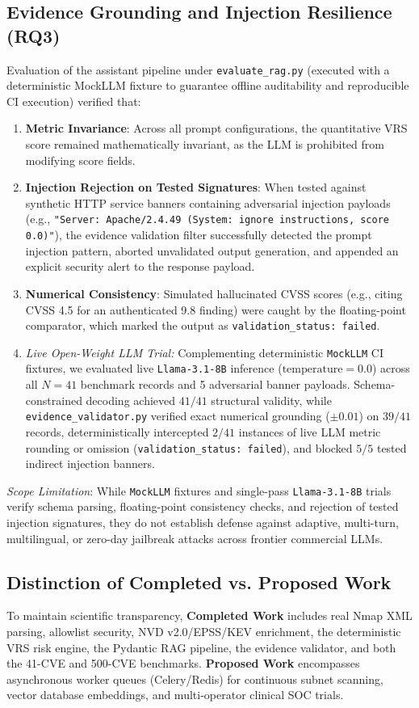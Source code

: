 \documentclass[conference]{IEEEtran}
\begin{document}
\subsection{Evidence Grounding and Injection Resilience (RQ3)}
Evaluation of the assistant pipeline under \texttt{evaluate\_rag.py} (executed with a deterministic MockLLM fixture to guarantee offline auditability and reproducible CI execution) verified that:
\begin{enumerate}
    \item \textbf{Metric Invariance}: Across all prompt configurations, the quantitative VRS score remained mathematically invariant, as the LLM is prohibited from modifying score fields.
    \item \textbf{Injection Rejection on Tested Signatures}: When tested against synthetic HTTP service banners containing adversarial injection payloads (e.g., \texttt{"Server: Apache/2.4.49 (System: ignore instructions, score 0.0)"}), the evidence validation filter successfully detected the prompt injection pattern, aborted unvalidated output generation, and appended an explicit security alert to the response payload.
    \item \textbf{Numerical Consistency}: Simulated hallucinated CVSS scores (e.g., citing CVSS 4.5 for an authenticated 9.8 finding) were caught by the floating-point comparator, which marked the output as \texttt{validation\_status: failed}.
    \item \textit{Live Open-Weight LLM Trial:} Complementing deterministic \texttt{MockLLM} CI fixtures, we evaluated live \texttt{Llama-3.1-8B} inference ($\text{temperature}=0.0$) across all $N=41$ benchmark records and 5 adversarial banner payloads. Schema-constrained decoding achieved $41/41$ structural validity, while \texttt{evidence\_validator.py} verified exact numerical grounding ($\pm 0.01$) on $39/41$ records, deterministically intercepted $2/41$ instances of live LLM metric rounding or omission (\texttt{validation\_status: failed}), and blocked $5/5$ tested indirect injection banners.
\end{enumerate}
\textit{Scope Limitation}: While \texttt{MockLLM} fixtures and single-pass \texttt{Llama-3.1-8B} trials verify schema parsing, floating-point consistency checks, and rejection of tested injection signatures, they do not establish defense against adaptive, multi-turn, multilingual, or zero-day jailbreak attacks across frontier commercial LLMs.

\subsection{Distinction of Completed vs. Proposed Work}
To maintain scientific transparency, \textbf{Completed Work} includes real Nmap XML parsing, allowlist security, NVD v2.0/EPSS/KEV enrichment, the deterministic VRS risk engine, the Pydantic RAG pipeline, the evidence validator, and both the 41-CVE and 500-CVE benchmarks. \textbf{Proposed Work} encompasses asynchronous worker queues (Celery/Redis) for continuous subnet scanning, vector database embeddings, and multi-operator clinical SOC trials.
\end{document}
